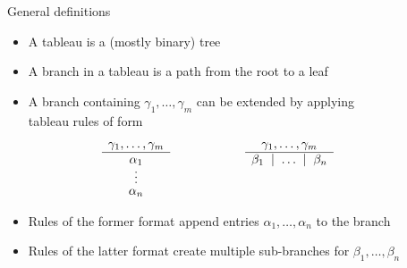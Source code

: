 \begin{frame}{General definitions}

\begin{itemize}
\item
A \alert{tableau} is a (mostly binary) tree
\item
A \alert{branch} in a tableau is a path from the root to a leaf
\item<2->
A branch containing $\gamma_1,\dots,\gamma_m$ can be extended by
applying\\ \alert{tableau rules} of form
\[
\begin{array}[t]{c}
\gamma_1,\dots,\gamma_m\\
\hline
\alpha_1\\[-1mm]
\vdots\\[-1mm]
\alpha_n
\end{array}
\qquad\qquad\qquad
\begin{array}[t]{c}
\gamma_1,\dots,\gamma_m\\
\hline
\beta_1\; \mid \; \dots \; \mid \;\beta_n
\end{array}
\qquad\qquad
\]
\item<3->
Rules of the former format append entries $\alpha_1,\dots,\alpha_n$ to the branch
\item<3->
Rules of the latter format create multiple sub-branches for $\beta_1,\dots,\beta_n$
\end{itemize}
\end{frame}
